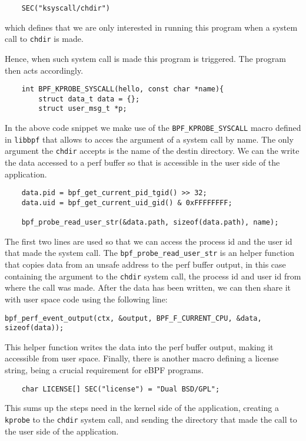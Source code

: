 \begin{lstlisting}
    SEC("ksyscall/chdir")
\end{lstlisting}
which defines that we are only interested in running this program when a system call to \texttt{chdir} is made. 

Hence, when such system call is made this program is triggered. The program then acts accordingly. 

\begin{lstlisting}
    int BPF_KPROBE_SYSCALL(hello, const char *name){
        struct data_t data = {};
        struct user_msg_t *p; 
\end{lstlisting}
In the above code snippet we make use of the \texttt{BPF\_KPROBE\_SYSCALL} macro defined in \texttt{libbpf} that allows to acces the argument of a system call by name. The only argument the \texttt{chdir} accepts is the name of the destin directory. We can the write the data accessed to a perf buffer so that is accessible in the user side of the application. 

\begin{lstlisting}
    data.pid = bpf_get_current_pid_tgid() >> 32;
    data.uid = bpf_get_current_uid_gid() & 0xFFFFFFFF;

    bpf_probe_read_user_str(&data.path, sizeof(data.path), name);
\end{lstlisting}
The first two lines are used so that we can access the process id and the user id that made the system call. 
The \texttt{bpf\_probe\_read\_user\_str} is an helper function that copies data from an unsafe address to the perf buffer output, in this case containing the argument to the \texttt{chdir} system call, the process id and user id from where the call was made.
After the data has been written, we can then share it with user space code using the following line: 
\begin{lstlisting}
bpf_perf_event_output(ctx, &output, BPF_F_CURRENT_CPU, &data, sizeof(data));
\end{lstlisting}
This helper function writes the data into the perf buffer output, making it accessible from user space. 
Finally, there is another macro defining a license string, being a crucial requirement for eBPF programs. 
\begin{lstlisting}
    char LICENSE[] SEC("license") = "Dual BSD/GPL";
\end{lstlisting}

This sums up the steps need in the kernel side of the application, creating a \texttt{kprobe} to the \texttt{chdir} system call, and sending the directory that made the call to the user side of the application. 

